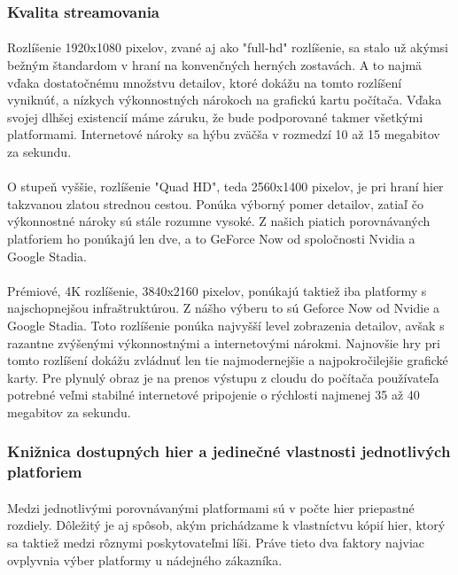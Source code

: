\documentclass[10pt,twoside,slovak,a4paper]{article}
\begin{document}
\subsubsection{Kvalita streamovania}

\paragraph{} Rozlíšenie 1920x1080 pixelov, zvané aj ako "full-hd" rozlíšenie, sa stalo už akýmsi bežným štandardom v hraní na konvenčných herných zostavách. A to najmä vďaka dostatočnému množstvu detailov, ktoré dokážu na tomto rozlíšení vyniknúť, a nízkych výkonnostných nárokoch na grafickú kartu počítača. Vďaka svojej dlhšej existencií máme záruku, že bude podporované takmer všetkými platformami. Internetové nároky sa hýbu zväčša v rozmedzí 10 až 15 megabitov za sekundu.

\paragraph{} O stupeň vyššie, rozlíšenie "Quad HD", teda 2560x1400 pixelov, je pri hraní hier takzvanou zlatou strednou cestou. Ponúka výborný pomer detailov, zatiaľ čo výkonnostné nároky sú stále rozumne vysoké. Z našich piatich porovnávaných platforiem ho ponúkajú len dve, a to GeForce Now od spoločnosti Nvidia a Google Stadia.

\paragraph{} Prémiové, 4K rozlíšenie, 3840x2160 pixelov, ponúkajú taktiež iba platformy s najschopnejšou infraštruktúrou. Z nášho výberu to sú Geforce Now od Nvidie a Google Stadia. Toto rozlíšenie ponúka najvyšší level zobrazenia detailov, avšak s razantne zvýšenými výkonnostnými a internetovými nárokmi. Najnovšie hry pri tomto rozlíšení dokážu zvládnuť len tie najmodernejšie a najpokročilejšie grafické karty. Pre plynulý obraz je na prenos výstupu z cloudu do počítača používateľa potrebné veľmi stabilné internetové pripojenie o rýchlosti najmenej 35 až 40 megabitov za sekundu.

\subsubsection{Knižnica dostupných hier a jedinečné vlastnosti jednotlivých platforiem}

\paragraph{} Medzi jednotlivými porovnávanými platformami sú v počte hier priepastné rozdiely. Dôležitý je aj spôsob, akým prichádzame k vlastníctvu kópií hier, ktorý sa taktiež medzi rôznymi poskytovateľmi líši. Práve tieto dva faktory najviac ovplyvnia výber platformy u nádejného zákazníka.
\end{document}

